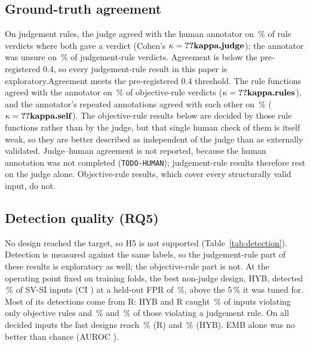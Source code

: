 \documentclass[conference]{IEEEtran}
\begin{document}
\subsection{Ground-truth agreement}
\ifhumanlabels On judgement rules, the judge agreed with the human annotator on \,\% of
 rule verdicts where both gave a verdict (Cohen's $\kappa=\R{kappa.judge}$); the annotator
was unsure on \,\% of judgement-rule verdicts. \ifjudgeweak Agreement is below the
pre-registered 0.4, so every judgement-rule result in this paper is exploratory.\else Agreement meets
the pre-registered 0.4 threshold.\fi{} The rule functions agreed with the annotator on
\,\% of objective-rule verdicts ($\kappa=\R{kappa.rules}$), and the annotator's
repeated annotations agreed with each other on \,\% ($\kappa=\R{kappa.self}$). The
objective-rule results below are decided by those rule functions rather than by the judge, but that
single human check of them is itself weak, so they are better described as independent of the judge
than as externally validated.\else
Judge--human agreement is not reported, because the human annotation was not completed
(\texttt{TODO-HUMAN}); judgement-rule results therefore rest on the judge alone. Objective-rule
results, which cover every structurally valid input, do not.\fi

\subsection{Detection quality (RQ5)}

No design reached the target, so H5 is not supported (Table~\ref{tab:detection}).\ifjudgeweak{}
Detection is measured against the same labels, so the judgement-rule part of these results is
exploratory as well; the objective-rule part is not.\fi{} At the operating
point fixed on training folds, the best non-judge design, HYB, detected \,\% of SV-SI
inputs (CI ) at a held-out FPR of \,\%, above the 5\,\% it was tuned for.
Most of its detections come from R: HYB and R caught \,\% of inputs violating only objective
rules and \,\% and \,\% of those violating a judgement rule. On all
decided inputs the fast designs reach \,\% (R) and \,\% (HYB).
EMB alone was no better than chance (AUROC ).
\end{document}
